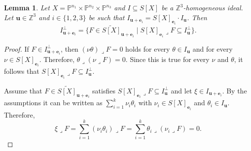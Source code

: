 \documentclass[12pt]{amsart}
\newtheorem{lemma}[theorem]{Lemma}
\theoremstyle{definition}
\theoremstyle{remark}
\theoremstyle{definition}
\begin{document}
\begin{lemma}\label{lem:inverseSystem}
    Let $X=\mathbb{P}^{n_1}\times \mathbb{P}^{n_2}\times \mathbb{P}^{n_3}$ and $I\subseteq S[X]$ be a $\mathbb{Z}^3$-homogeneous ideal.
    Let $\mathbf{u}\in  \mathbb{Z}^3$ and $i\in \{1,2,3\}$ be such that $I_{\mathbf{u} + \mathbf{e}_i} = S[X]_{\mathbf{e}_i}\cdot I_{\mathbf{u}}$. Then
    \[
    I_{\mathbf{u}+\mathbf{e}_i}^\perp = \{F \in \widetilde{S[X]}_{\mathbf{u}+\mathbf{e}_i} \mid S[X]_{\mathbf{e}_i}\lrcorner F \subseteq I_{\mathbf{u}}^\perp \}.
    \]
\end{lemma}
\begin{proof}
    If $F\in I_{\mathbf{u}+\mathbf{e}_i}^\perp$, then $(\nu \theta)\lrcorner F = 0$ holds for every $\theta\in I_{\mathbf{u}}$ and for every  $\nu\in S[X]_{\mathbf{e}_i}$.
    Therefore, $\theta \lrcorner (\nu \lrcorner F) = 0$. Since this is true for every $\nu$ and $\theta$, it follows that $S[X]_{\mathbf{e}_i}\lrcorner F \subseteq I_{\mathbf{u}}^\perp$.

    Assume that $F\in \widetilde{S[X]}_{\mathbf{u}+\mathbf{e}_i}$ satisfies $S[X]_{\mathbf{e}_i}\lrcorner F \subseteq I_{\mathbf{u}}^\perp$ and let $\xi\in I_{\mathbf{u}+\mathbf{e}_i}$. By the assumptions it can be written as $\sum_{i=1}^k \nu_i \theta_i$ with $\nu_i\in S[X]_{\mathbf{e}_i}$ and $\theta_i \in I_\mathbf{u}$.
    Therefore,
    \[
    \xi \lrcorner F = \sum_{i=1}^k (\nu_i \theta_i)\lrcorner F = \sum_{i=1}^k \theta_i \lrcorner (\nu_i \lrcorner F) = 0.
    \]
\end{proof}
\end{document}
